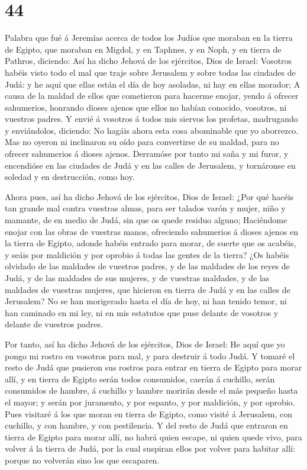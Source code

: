 \hypertarget{section-43}{%
\section{44}\label{section-43}}

 Palabra que fué á Jeremías acerca de todos los Judíos que
moraban en la tierra de Egipto, que moraban en Migdol, y en Taphnes, y
en Noph, y en tierra de Pathros, diciendo:  Así ha dicho
Jehová de los ejércitos, Dios de Israel: Vosotros habéis visto todo el
mal que traje sobre Jerusalem y sobre todas las ciudades de Judá: y he
aquí que ellas están el día de hoy asoladas, ni hay en ellas morador;
 A causa de la maldad de ellos que cometieron para hacerme
enojar, yendo á ofrecer sahumerios, honrando dioses ajenos que ellos no
habían conocido, vosotros, ni vuestros padres.  Y envié á
vosotros á todos mis siervos los profetas, madrugando y enviándolos,
diciendo: No hagáis ahora esta cosa abominable que yo aborrezco.
 Mas no oyeron ni inclinaron su oído para convertirse de su
maldad, para no ofrecer sahumerios á dioses ajenos. 
Derramóse por tanto mi saña y mi furor, y encendióse en las ciudades de
Judá y en las calles de Jerusalem, y tornáronse en soledad y en
destrucción, como hoy.

 Ahora pues, así ha dicho Jehová de los ejércitos, Dios de
Israel: ¿Por qué hacéis tan grande mal contra vuestras almas, para ser
talados varón y mujer, niño y mamante, de en medio de Judá, sin que os
quede residuo alguno;  Haciéndome enojar con las obras de
vuestras manos, ofreciendo sahumerios á dioses ajenos en la tierra de
Egipto, adonde habéis entrado para morar, de suerte que os acabéis, y
seáis por maldición y por oprobio á todas las gentes de la tierra?
 ¿Os habéis olvidado de las maldades de vuestros padres, y
de las maldades de los reyes de Judá, y de las maldades de sus mujeres,
y de vuestras maldades, y de las maldades de vuestras mujeres, que
hicieron en tierra de Judá y en las calles de Jerusalem? 
No se han morigerado hasta el día de hoy, ni han tenido temor, ni han
caminado en mi ley, ni en mis estatutos que puse delante de vosotros y
delante de vuestros padres.

 Por tanto, así ha dicho Jehová de los ejércitos, Dios de
Israel: He aquí que yo pongo mi rostro en vosotros para mal, y para
destruir á todo Judá.  Y tomaré el resto de Judá que
pusieron sus rostros para entrar en tierra de Egipto para morar allí, y
en tierra de Egipto serán todos consumidos, caerán á cuchillo, serán
consumidos de hambre, á cuchillo y hambre morirán desde el más pequeño
hasta el mayor; y serán por juramento, y por espanto, y por maldición, y
por oprobio.  Pues visitaré á los que moran en tierra de
Egipto, como visité á Jerusalem, con cuchillo, y con hambre, y con
pestilencia.  Y del resto de Judá que entraron en tierra de
Egipto para morar allí, no habrá quien escape, ni quien quede vivo, para
volver á la tierra de Judá, por la cual suspiran ellos por volver para
habitar allí: porque no volverán sino los que escaparen.

